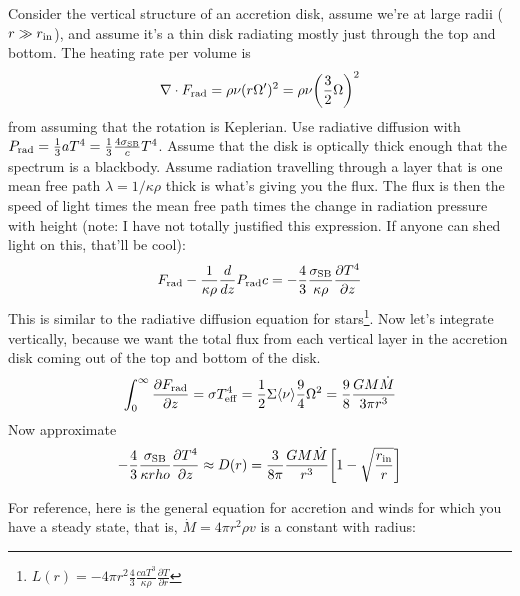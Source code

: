 \begin{enumerate}
      Consider the vertical structure of an accretion disk, assume we're at large radii ($r \gg r_{\rm in}$), and assume it's a thin disk radiating mostly just through the top and bottom. The heating rate per volume is
      \begin{equation}
      \nabla \cdot F_{\rm rad} = \rho \nu (r \Omega^\prime)^2 = \rho \nu \biggl(\frac{3}{2} \Omega \biggr)^2
      \end{equation}
      from assuming that the rotation is Keplerian. Use radiative diffusion with $P_{\rm rad} = \frac{1}{3} a T^4 = \frac{1}{3}\frac{4 \sigma_{\rm SB}}{c}T^4$. Assume that the disk is optically thick enough that the spectrum is a blackbody. Assume radiation travelling through a layer that is one mean free path $\lambda = 1/\kappa \rho$ thick is what's giving you the flux. The flux is then the speed of light times the mean free path times the change in radiation pressure with height (note: I have not totally justified this expression. If anyone can shed light on this, that'll be cool):
      \begin{equation}
      F_{\rm rad} - \frac{1}{\kappa \rho} \frac{d}{dz}P_{\rm rad} c = -\frac{4}{3}\frac{\sigma_{\rm SB}}{\kappa \rho}\frac{\partial T^4}{\partial z}
      \end{equation}
      This is similar to the radiative diffusion equation for stars\footnote{$L(r) = -4 \pi r^2 \frac{4}{3} \frac{c a T^3}{\kappa\rho}\frac{\partial T}{\partial r}$}. Now let's integrate vertically, because we want the total flux from each vertical layer in the accretion disk coming out of the top and bottom of the disk.
      \begin{equation}
      \int^\infty_0 \frac{\partial F_{\rm rad}}{\partial z} = \sigma T_{\rm eff}^4 = \frac{1}{2} \Sigma \langle \nu \rangle \frac{9}{4}\Omega^2 = \frac{9}{8} \frac{G M \dot{M}}{3 \pi r^3}
      \end{equation}
      Now approximate 
      \begin{equation}
      -\frac{4}{3} \frac{\sigma_{\rm SB}}{\kappa rho} \frac{\partial T^4}{\partial z} \approx D(r) = \frac{3}{8 \pi}\frac{GM\dot{M}}{r^3}\biggl[1 - \sqrt{\frac{r_{\rm in}}{r}} \biggr]
      \end{equation}
      
      
\end{enumerate}

For reference, here is the general equation for accretion and winds for which you have a steady state, that is, $\dot{M} = 4 \pi r^2 \rho v$ is a constant with radius:

